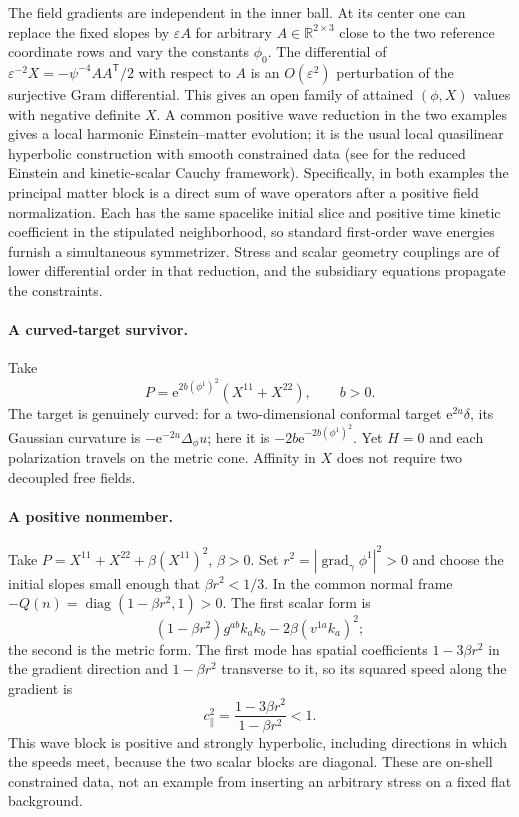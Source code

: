 \documentclass[11pt]{article}
\newcommand{\RR}{\mathbb R}
\newcommand{\e}{\mathrm e}
\begin{document}
The field gradients are independent in the inner ball. At its center one can replace the fixed slopes by \(\varepsilon A\) for arbitrary \(A\in\RR^{2\times3}\) close to the two reference coordinate rows and vary the constants \(\phi_0\). The differential of \(\varepsilon^{-2}X=-\psi^{-4}AA^{\mathsf T}/2\) with respect to \(A\) is an \(O(\varepsilon^2)\) perturbation of the surjective Gram differential. This gives an open family of attained \((\phi,X)\) values with negative definite \(X\). A common positive wave reduction in the two examples gives a local harmonic Einstein--matter evolution; it is the usual local quasilinear hyperbolic construction with smooth constrained data (see \cite{Friedrich,Rendall} for the reduced Einstein and kinetic-scalar Cauchy framework). Specifically, in both examples the principal matter block is a direct sum of wave operators after a positive field normalization. Each has the same spacelike initial slice and positive time kinetic coefficient in the stipulated neighborhood, so standard first-order wave energies furnish a simultaneous symmetrizer. Stress and scalar geometry couplings are of lower differential order in that reduction, and the subsidiary equations propagate the constraints.

\paragraph{A curved-target survivor.}
Take
\[
 P=\e^{2b(\phi^1)^2}(X^{11}+X^{22}),\qquad b>0 .
\]
The target is genuinely curved: for a two-dimensional conformal target \(\e^{2u}\delta\), its Gaussian curvature is \(-\e^{-2u}\Delta_\phi u\); here it is \(-2b\e^{-2b(\phi^1)^2}\). Yet \(H=0\) and each polarization travels on the metric cone. Affinity in \(X\) does not require two decoupled free fields.

\paragraph{A positive nonmember.}
Take \(P=X^{11}+X^{22}+\beta(X^{11})^2\), \(\beta>0\).
Set \(r^2=|\operatorname{grad}_\gamma\phi^1|^2>0\) and choose the initial slopes small enough that \(\beta r^2<1/3\). In the common normal frame \(-Q(n)=\operatorname{diag}(1-\beta r^2,1)>0\). The first scalar form is
\[
 (1-\beta r^2)g^{ab}k_a k_b-2\beta(v^{1a}k_a)^2;
\]
the second is the metric form. The first mode has spatial coefficients \(1-3\beta r^2\) in the gradient direction and \(1-\beta r^2\) transverse to it, so its squared speed along the gradient is
\[
 c_{\parallel}^2=\frac{1-3\beta r^2}{1-\beta r^2}<1 .
\]
This wave block is positive and strongly hyperbolic, including directions in which the speeds meet, because the two scalar blocks are diagonal. These are on-shell constrained data, not an example from inserting an arbitrary stress on a fixed flat background.
\end{document}
